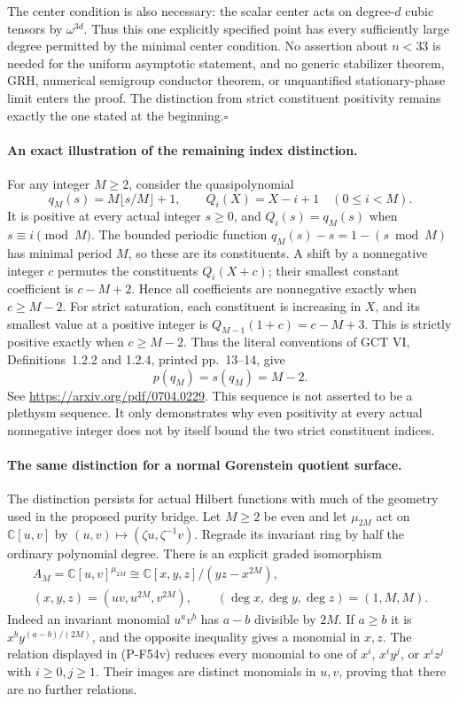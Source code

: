 The center condition is also necessary: the scalar center
acts on degree-$d$ cubic tensors by $\omega^{3d}$.
Thus this one explicitly specified point has every
sufficiently large degree permitted by the minimal center
condition. No assertion about $n<33$ is needed for the
uniform asymptotic statement, and no generic stabilizer
theorem, GRH, numerical semigroup conductor theorem, or
unquantified stationary-phase limit enters the proof.
The distinction from strict constituent positivity remains
exactly the one stated at the beginning.\hfill$\square$

\paragraph{An exact illustration of the remaining index distinction.}
For any integer $M\ge2$, consider the quasipolynomial
\[
 q_M(s)=M\lfloor s/M\rfloor+1,
 \qquad Q_i(X)=X-i+1\quad(0\le i<M).                       \tag{P-F54t}
\]
It is positive at every actual integer $s\ge0$, and
$Q_i(s)=q_M(s)$ when $s\equiv i\pmod M$.
The bounded periodic function $q_M(s)-s=1-(s\bmod M)$
has minimal period $M$, so these are its constituents.
A shift by a nonnegative integer $c$ permutes the
constituents $Q_i(X+c)$; their smallest constant
coefficient is $c-M+2$. Hence all coefficients are
nonnegative exactly when $c\ge M-2$.
For strict saturation, each constituent is increasing
in $X$, and its smallest value at a positive integer
is $Q_{M-1}(1+c)=c-M+3$. This is strictly positive
exactly when $c\ge M-2$. Thus the literal conventions
of GCT VI, Definitions~1.2.2 and 1.2.4, printed
pp.~13--14, give
\[
                   p(q_M)=s(q_M)=M-2.                    \tag{P-F54u}
\]
See \url{https://arxiv.org/pdf/0704.0229}.
This sequence is not asserted to be a plethysm sequence.
It only demonstrates why even positivity at every actual
nonnegative integer does not by itself bound the two
strict constituent indices.

\paragraph{The same distinction for a normal Gorenstein quotient surface.}
The distinction persists for actual Hilbert functions with much of
the geometry used in the proposed purity bridge. Let $M\ge2$ be even
and let $\mu_{2M}$ act on $\mathbb C[u,v]$ by
$(u,v)\mapsto(\zeta u,\zeta^{-1}v)$. Regrade its invariant ring
by half the ordinary polynomial degree. There is an explicit graded
isomorphism
\[
 \begin{gathered}
 A_M=\mathbb C[u,v]^{\mu_{2M}}
   \cong\mathbb C[x,y,z]/(yz-x^{2M}),\\
 (x,y,z)=(uv,u^{2M},v^{2M}),\qquad
 (\deg x,\deg y,\deg z)=(1,M,M).
 \end{gathered}                                         \tag{P-F54v}
\]
Indeed an invariant monomial $u^av^b$ has $a-b$ divisible
by $2M$. If $a\ge b$ it is $x^by^{(a-b)/(2M)}$, and the
opposite inequality gives a monomial in $x,z$.
The relation displayed in (P-F54v) reduces every monomial
to one of
$x^i$, $x^iy^j$, or $x^iz^j$ with $i\ge0,j\ge1$.
Their images are distinct monomials in $u,v$, proving that
there are no further relations.

